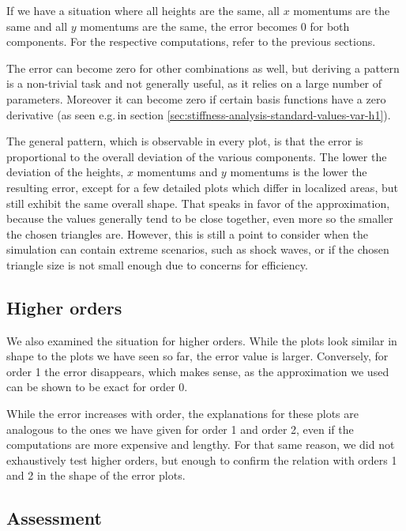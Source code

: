 \documentclass[a4paper, twoside]{article}
\begin{document}
If we have a situation where all heights are the same, all $x$ momentums are the same and all $y$ momentums are the same, the error becomes 0 for both components.
For the respective computations, refer to the previous sections.

The error can become zero for other combinations as well, but deriving a pattern is a non-trivial task and not generally useful, as it relies on a large number of parameters.
Moreover it can become zero if certain basis functions have a zero derivative (as seen e.g.\,in section \ref{sec:stiffness-analysis-standard-values-var-h1}).

The general pattern, which is observable in every plot, is that the error is proportional to the overall deviation of the various components.
The lower the deviation of the heights, $x$ momentums and $y$ momentums is the lower the resulting error, except for a few detailed plots which differ in localized areas, but still exhibit the same overall shape.
That speaks in favor of the approximation, because the values generally tend to be close together, even more so the smaller the chosen triangles are.
However, this is still a point to consider when the simulation can contain extreme scenarios, such as shock waves, or if the chosen triangle size is not small enough due to concerns for efficiency.

\subsection{Higher orders}
\label{sec:stiffness-analysis-conclusion-higher-order}

We also examined the situation for higher orders. While the plots look similar in shape to the plots we have seen so far, the error value is larger. Conversely, for order 1 the error disappears, which makes sense, as the approximation we used can be shown to be exact for order 0.

While the error increases with order, the explanations for these plots are analogous to the ones we have given for order 1 and order 2, even if the computations are more expensive and lengthy. For that same reason, we did not exhaustively test higher orders, but enough to confirm the relation with orders 1 and 2 in the shape of the error plots.

\subsection{Assessment}
\end{document}
